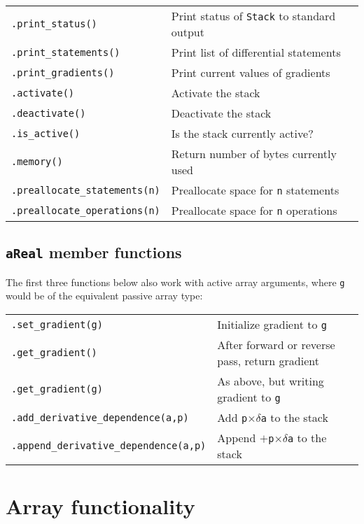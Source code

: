 \documentclass[10pt,a4,landscape]{article}
\def\code#1{\texttt{#1}}
\begin{document}
\begin{tabular}{ll}
\code{.print\_status()} & Print status of \code{Stack} to standard output\\
\code{.print\_statements()} & Print list of differential statements\\
\code{.print\_gradients()} & Print current values of gradients\\
\code{.activate()} & Activate the stack \\
\code{.deactivate()} & Deactivate the stack\\
\code{.is\_active()} & Is the stack currently active?\\
\code{.memory()} & Return number of bytes currently used\\
\code{.preallocate\_statements(n)} & Preallocate space for \code{n} statements\\
\code{.preallocate\_operations(n)} & Preallocate space for \code{n} operations\\
\end{tabular}
\subsection*{\code{aReal} member functions}
The first three functions below also work with active array arguments, where
\code{g} would be of the equivalent passive array type:\\
\begin{tabular}{ll}
\code{.set\_gradient(g)} & Initialize gradient to \code{g} \\
\code{.get\_gradient()} & After forward or reverse pass, return gradient\\
\code{.get\_gradient(g)} & As above, but writing gradient to \code{g}\\
\code{.add\_derivative\_dependence(a,p)} & Add \code{p}$\times\delta$\code{a} to the stack\\
\code{.append\_derivative\_dependence(a,p)} & Append $+$\code{p}$\times\delta$\code{a} to the stack\\
\end{tabular}

\section*{Array functionality}
\end{document}
